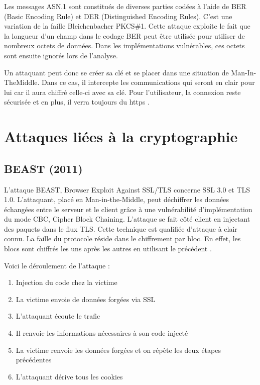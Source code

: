 Les messages ASN.1 sont constitués de diverses parties codées à l'aide de BER (Basic Encoding Rule) et DER (Distinguished Encoding Rules). C'est une variation de la faille Bleichenbacher PKCS\#1. Cette attaque exploite le fait que la longueur d'un champ dans le codage BER peut être utilisée pour utiliser de nombreux octets de données. Dans les implémentations vulnérables, ces octets sont ensuite ignorés lors de l'analyse.

Un attaquant peut donc se créer sa clé et se placer dans une situation de Man-In-TheMiddle. Dans ce cas, il intercepte les communications qui seront en clair pour lui car il aura chiffré celle-ci avec sa clé. Pour l'utilisateur, la connexion reste sécurisée et en plus, il verra toujours du https \cite{berserk}.

\section{Attaques liées à la cryptographie}

\subsection{BEAST (2011)}
L'attaque BEAST, Browser Exploit Against SSL/TLS concerne SSL 3.0 et TLS 1.0. L'attaquant, placé en Man-in-the-Middle, peut déchiffrer les données échangées entre le serveur et le client grâce à une vulnérabilité d'implémentation du mode CBC, Cipher Block Chaining. L'attaque se fait côté client en injectant des paquets dans le flux TLS. Cette technique est qualifiée d'attaque à clair connu. La faille du protocole réside dans le chiffrement par bloc. En effet, les blocs sont chiffrés les uns après les autres en utilisant le précédent \cite{beast}.

Voici le déroulement de l'attaque :

\begin{enumerate}
\item Injection du code chez la victime
\item La victime envoie de données forgées via SSL
\item L'attaquant écoute le trafic
\item Il renvoie les informations nécessaires à son code injecté
\item La victime renvoie les données forgées et on répète les deux étapes précédentes
  \item L'attaquant dérive tous les cookies
\end{enumerate}


